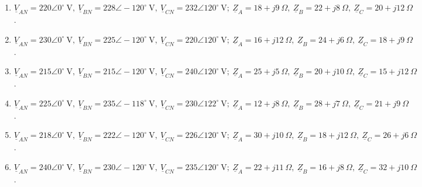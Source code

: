 \documentclass[../main]{subfiles}
\begin{document}
\begin{enumerate}
  \item $\underline{V}_{AN}=220\angle
    0^\circ\ \text{V},\ \underline{V}_{BN}=228\angle
    -120^\circ\ \text{V},\ \underline{V}_{CN}=232\angle
    120^\circ\ \text{V};\ \underline{Z}_A=18+j9\ \Omega,\ \underline{Z}_B=22+j8\ \Omega,\ \underline{Z}_C=20+j12\ \Omega$.

  \item $\underline{V}_{AN}=230\angle
    0^\circ\ \text{V},\ \underline{V}_{BN}=225\angle
    -120^\circ\ \text{V},\ \underline{V}_{CN}=220\angle
    120^\circ\ \text{V};\ \underline{Z}_A=16+j12\ \Omega,\ \underline{Z}_B=24+j6\ \Omega,\ \underline{Z}_C=18+j9\ \Omega$.

  \item $\underline{V}_{AN}=215\angle
    0^\circ\ \text{V},\ \underline{V}_{BN}=215\angle
    -120^\circ\ \text{V},\ \underline{V}_{CN}=240\angle
    120^\circ\ \text{V};\ \underline{Z}_A=25+j5\ \Omega,\ \underline{Z}_B=20+j10\ \Omega,\ \underline{Z}_C=15+j12\ \Omega$.

  \item $\underline{V}_{AN}=225\angle
    0^\circ\ \text{V},\ \underline{V}_{BN}=235\angle
    -118^\circ\ \text{V},\ \underline{V}_{CN}=230\angle
    122^\circ\ \text{V};\ \underline{Z}_A=12+j8\ \Omega,\ \underline{Z}_B=28+j7\ \Omega,\ \underline{Z}_C=21+j9\ \Omega$.

  \item $\underline{V}_{AN}=218\angle
    0^\circ\ \text{V},\ \underline{V}_{BN}=222\angle
    -120^\circ\ \text{V},\ \underline{V}_{CN}=226\angle
    120^\circ\ \text{V};\ \underline{Z}_A=30+j10\ \Omega,\ \underline{Z}_B=18+j12\ \Omega,\ \underline{Z}_C=26+j6\ \Omega$.

  \item $\underline{V}_{AN}=240\angle
    0^\circ\ \text{V},\ \underline{V}_{BN}=230\angle
    -120^\circ\ \text{V},\ \underline{V}_{CN}=235\angle
    120^\circ\ \text{V};\ \underline{Z}_A=22+j11\ \Omega,\ \underline{Z}_B=16+j8\ \Omega,\ \underline{Z}_C=32+j10\ \Omega$.
\end{enumerate}
\end{document}
